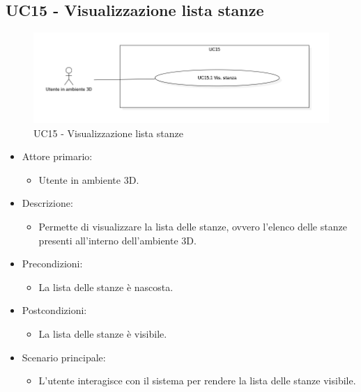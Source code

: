 \pagebreak

\subsection{UC15 - Visualizzazione lista stanze}

\begin{figure}[H]
  \renewcommand{\thefigure}{15}
  \includegraphics[width=\linewidth]{./res/images/UC15.png}
  \caption{UC15 - Visualizzazione lista stanze}
  \label{fig:UC 15}
\end{figure}

\begin{itemize}

	\item Attore primario: 
	\begin{itemize}
		\item Utente in ambiente 3D.
	\end{itemize}
	\item Descrizione:
	\begin{itemize}
		\item Permette di visualizzare la lista delle stanze, ovvero l'elenco delle stanze presenti all'interno dell'ambiente 3D.
	\end{itemize}
	
	\item Precondizioni:
	\begin{itemize}
		\item La lista delle stanze è nascosta.
	\end{itemize}
	
	\item Postcondizioni:
	\begin{itemize}
		\item La lista delle stanze è visibile.
	\end{itemize}
	
	\item Scenario principale:
	\begin{itemize}
		\item L'utente interagisce con il sistema per rendere la lista delle stanze visibile.
	\end{itemize}
	
\end{itemize}

